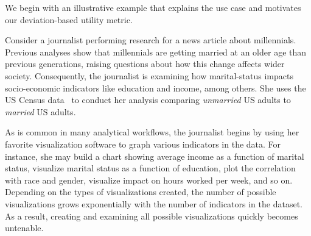 We begin with an illustrative example that explains the \SeeDB use case and motivates our deviation-based
utility metric. 
\begin{example}
Consider a journalist performing research for a news article about millennials.
Previous analyses show that millennials are getting married at an older age than 
previous generations, raising questions about how this change affects
wider society.
Consequently, the journalist is examining how marital-status
impacts socio-economic indicators like education and income, among others.
She uses the US Census data~\cite{census}
to conduct her analysis comparing {\em unmarried} US adults
to {\em married} US adults.

As is common in many analytical workflows, the journalist begins by using her favorite 
visualization software to graph various indicators in the data.
For instance, she may build a chart showing average income as a function of marital status,
visualize marital status as a function of education, plot the correlation with race and gender,
visualize impact on hours worked per week, and so on.
Depending on the types of visualizations created, the number of possible 
visualizations grows exponentially with the number of indicators in the dataset.
As a result, creating and examining all possible visualizations
quickly becomes untenable.


\end{example}
